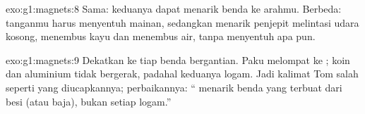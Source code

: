 \begin{solution}{exo:g1:magnets:8}
Sama: keduanya dapat menarik benda ke arahmu. Berbeda: tanganmu harus
menyentuh mainan, sedangkan  menarik penjepit melintasi udara
kosong, menembus kayu dan menembus air, tanpa menyentuh apa pun.
\end{solution}

\begin{solution}{exo:g1:magnets:9}
Dekatkan  ke tiap benda bergantian. Paku melompat ke ;
koin dan aluminium tidak bergerak, padahal keduanya logam. Jadi
kalimat Tom salah seperti yang diucapkannya; perbaikannya: ``
menarik benda yang terbuat dari besi (atau baja), bukan setiap logam.''
\end{solution}
